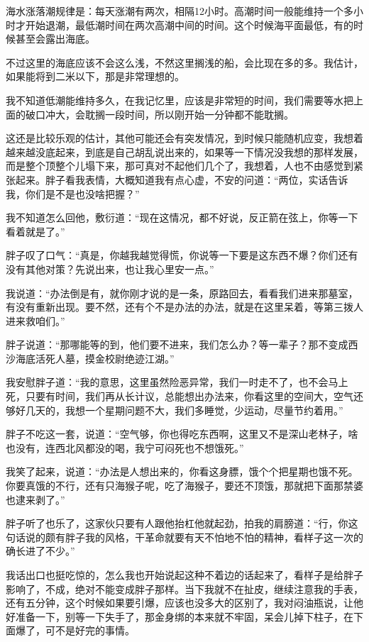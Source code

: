 海水涨落潮规律是：每天涨潮有两次，相隔12小时。高潮时间一般能维持一个多小时才开始退潮，最低潮时间在两次高潮中间的时间。这个时候海平面最低，有的时候甚至会露出海底。

不过这里的海底应该不会这么浅，不然这里搁浅的船，会比现在多的多。我估计，如果能将到二米以下，那是非常理想的。

我不知道低潮能维持多久，在我记忆里，应该是非常短的时间，我们需要等水把上面的破口冲大，会耽搁一段时间，所以刚开始一分钟都不能耽搁。

这还是比较乐观的估计，其他可能还会有突发情况，到时候只能随机应变，我想着越来越没底起来，到底是自己胡乱说出来的，如果等一下情况没我想的那样发展，而是整个顶整个儿塌下来，那可真对不起他们几个了，我想着，人也不由感觉到紧张起来。胖子看我表情，大概知道我有点心虚，不安的问道：“两位，实话告诉我，你们是不是也没啥把握？”

我不知道怎么回他，敷衍道：“现在这情况，都不好说，反正箭在弦上，你等一下看着就是了。”

胖子叹了口气：“真是，你越我越觉得慌，你说等一下要是这东西不爆？你们还有没有其他对策？先说出来，也让我心里安一点。”

我说道：“办法倒是有，就你刚才说的是一条，原路回去，看看我们进来那墓室，有没有重新出现。要不然，还有个不是办法的办法，就是在这里呆着，等第三拨人进来救咱们。”

胖子说道：“那哪能等的到，他们要不进来，我们怎么办？等一辈子？那不变成西沙海底活死人墓，摸金校尉绝迹江湖。”

我安慰胖子道：“我的意思，这里虽然险恶异常，我们一时走不了，也不会马上死，只要有时间，我们再从长计议，总能想出办法来，你看这里的空间大，空气还够好几天的，我想一个星期问题不大，我们多睡觉，少运动，尽量节约着用。”

胖子不吃这一套，说道：“空气够，你也得吃东西啊，这里又不是深山老林子，啥也没有，连西北风都没的喝，我宁可闷死也不想饿死。”

我笑了起来，说道：“办法是人想出来的，你看这身膘，饿个个把星期也饿不死。你要真饿的不行，还有只海猴子呢，吃了海猴子，要还不顶饿，那就把下面那禁婆也逮来剥了。”

胖子听了也乐了，这家伙只要有人跟他抬杠他就起劲，拍我的肩膀道：“行，你这句话说的颇有胖子我的风格，干革命就要有天不怕地不怕的精神，看样子这一次的确长进了不少。”

我话出口也挺吃惊的，怎么我也开始说起这种不着边的话起来了，看样子是给胖子影响了，不成，绝对不能变成胖子那样。当下我就不在扯皮，继续注意我的手表，还有五分钟，这个时候如果要引爆，应该也没多大的区别了，我对闷油瓶说，让他好准备一下，别等一下失手了，那金身绑的本来就不牢固，呆会儿掉下柱子，在下面爆了，可不是好完的事情。

